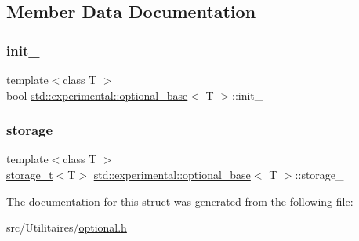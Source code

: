 \subsection{Member Data Documentation}
\mbox{\label{structstd_1_1experimental_1_1optional__base_aa0df221e8ebf3abc45c0e78d0b963c01}} 
\subsubsection{\texorpdfstring{init\+\_\+}{init\_}}
{\footnotesize\ttfamily template$<$class T $>$ \\
bool \mbox{\hyperlink{structstd_1_1experimental_1_1optional__base}{std\+::experimental\+::optional\+\_\+base}}$<$ T $>$\+::init\+\_\+}

\mbox{\label{structstd_1_1experimental_1_1optional__base_aa7f2be708eddd8066eee64ef852e4314}} 
\subsubsection{\texorpdfstring{storage\+\_\+}{storage\_}}
{\footnotesize\ttfamily template$<$class T $>$ \\
\mbox{\hyperlink{unionstd_1_1experimental_1_1storage__t}{storage\+\_\+t}}$<$T$>$ \mbox{\hyperlink{structstd_1_1experimental_1_1optional__base}{std\+::experimental\+::optional\+\_\+base}}$<$ T $>$\+::storage\+\_\+}



The documentation for this struct was generated from the following file\+:\begin{DoxyCompactItemize}
\item 
src/\+Utilitaires/\mbox{\hyperlink{optional_8h}{optional.\+h}}\end{DoxyCompactItemize}
